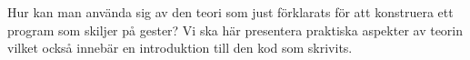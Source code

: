 \documentclass[../rapport_MVEX01-11-05]{subfiles}
\begin{document}
Hur kan man använda sig av den teori som just förklarats för att konstruera
ett program som skiljer på gester? Vi ska här presentera praktiska aspekter
av teorin vilket också innebär en introduktion till den kod som skrivits.

\end{document}
